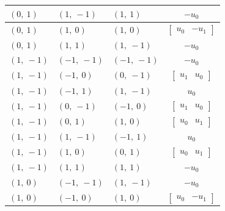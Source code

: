 \documentclass[11pt]{article}
\theoremstyle{definition}
\begin{document}
\begin{longtable}{|l|l|l|c|}
    \hline
    $\left( 0, \  1\right)$ & $\left( 1, \  -1\right)$ & $\left( 1, \  1\right)$ & $- u_{0}$ \\
    \hline
    $\left( 0, \  1\right)$ & $\left( 1, \  0\right)$ & $\left( 1, \  0\right)$ & $\left[\begin{matrix}u_{0} & - u_{1}\end{matrix}\right]$ \\
    \hline
    $\left( 0, \  1\right)$ & $\left( 1, \  1\right)$ & $\left( 1, \  -1\right)$ & $- u_{0}$ \\
    \hline
    $\left( 1, \  -1\right)$ & $\left( -1, \  -1\right)$ & $\left( -1, \  -1\right)$ & $- u_{0}$ \\
    \hline
    $\left( 1, \  -1\right)$ & $\left( -1, \  0\right)$ & $\left( 0, \  -1\right)$ & $\left[\begin{matrix}u_{1} & u_{0}\end{matrix}\right]$ \\
    \hline
    $\left( 1, \  -1\right)$ & $\left( -1, \  1\right)$ & $\left( 1, \  -1\right)$ & $u_{0}$ \\
    \hline
    $\left( 1, \  -1\right)$ & $\left( 0, \  -1\right)$ & $\left( -1, \  0\right)$ & $\left[\begin{matrix}u_{1} & u_{0}\end{matrix}\right]$ \\
    \hline
    $\left( 1, \  -1\right)$ & $\left( 0, \  1\right)$ & $\left( 1, \  0\right)$ & $\left[\begin{matrix}u_{0} & u_{1}\end{matrix}\right]$ \\
    \hline
    $\left( 1, \  -1\right)$ & $\left( 1, \  -1\right)$ & $\left( -1, \  1\right)$ & $u_{0}$ \\
    \hline
    $\left( 1, \  -1\right)$ & $\left( 1, \  0\right)$ & $\left( 0, \  1\right)$ & $\left[\begin{matrix}u_{0} & u_{1}\end{matrix}\right]$ \\
    \hline
    $\left( 1, \  -1\right)$ & $\left( 1, \  1\right)$ & $\left( 1, \  1\right)$ & $- u_{0}$ \\
    \hline
    $\left( 1, \  0\right)$ & $\left( -1, \  -1\right)$ & $\left( 1, \  -1\right)$ & $- u_{0}$ \\
    \hline
    $\left( 1, \  0\right)$ & $\left( -1, \  0\right)$ & $\left( 1, \  0\right)$ & $\left[\begin{matrix}u_{0} & - u_{1}\end{matrix}\right]$ \\

\end{longtable}
\end{document}
